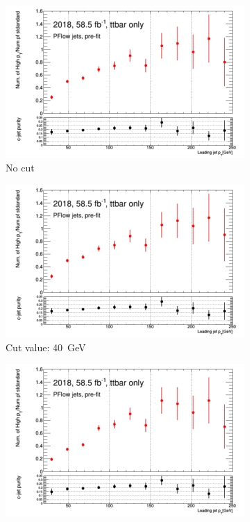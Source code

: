 \begin{figure}[bth]
	\centering
	\begin{subfigure}[t]{.38\linewidth}
\includegraphics[width=1\textwidth]{FTAG_plots/stat_gains/statsgain_0GeV.png}
\caption{No cut}
\end{subfigure}
\begin{subfigure}[t]{.38\linewidth}
\includegraphics[width=1\textwidth]{FTAG_plots/stat_gains/statsgain_40GeV.png}
\caption{Cut value: 40~GeV}
\end{subfigure}
\begin{subfigure}[t]{.38\linewidth}
\includegraphics[width=1\textwidth]{FTAG_plots/stat_gains/statsgain_70GeV.png}

\end{subfigure}
\end{figure}
